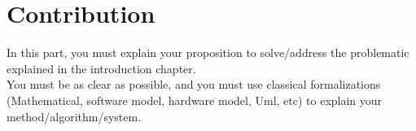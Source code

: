 \chapter{Contribution}



In this part, you must explain your proposition to solve/address the problematic explained in the introduction chapter.\\

You must be as clear  as possible, and you must use classical formalizations (Mathematical, software model, hardware model, Uml, etc) to explain 
your method/algorithm/system.




